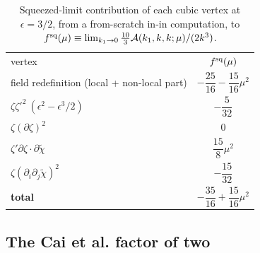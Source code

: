 \documentclass[aps,prd,twocolumn,superscriptaddress,nofootinbib,longbibliography]{revtex4-2}
\begin{document}
\begin{table}[t]
\caption{\label{tab:vertices}Squeezed-limit contribution of each cubic vertex at
$\epsilon=3/2$, from a from-scratch in-in computation, to
$f^{\rm sq}(\mu)\equiv\lim_{k_1\to0}\tfrac{10}{3}\mathcal A(k_1,k,k;\mu)/(2k^3)$.}
\begin{ruledtabular}
\footnotesize
\begin{tabular}{lc}
vertex & $f^{\rm sq}(\mu)$ \\
\colrule
field redefinition (local + non-local part) & $-\dfrac{25}{16}-\dfrac{15}{16}\mu^2$ \\
$\zeta\zeta'^2\ (\epsilon^2-\epsilon^3/2)$ & $-\dfrac{5}{32}$ \\
$\zeta(\partial\zeta)^2$\footnotemark[1] & $0$ \\
$\zeta'\partial\zeta\!\cdot\!\partial\tilde\chi$ & $\dfrac{15}{8}\mu^2$ \\
$\zeta(\partial_i\partial_j\tilde\chi)^2$ & $-\dfrac{15}{32}$ \\
\colrule
\textbf{total} & $-\dfrac{35}{16}+\dfrac{15}{16}\mu^2$ \\
\end{tabular}
\end{ruledtabular}
\end{table}

\subsection{The Cai et al. factor of two}
\end{document}
